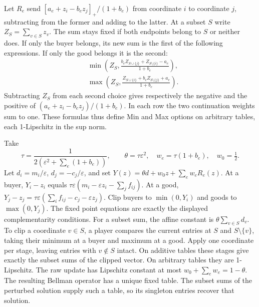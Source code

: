 \documentclass[11pt,oneside,openany,notitlepage]{report}
\begin{document}
Let \(R_e\) send \([a_e+z_i-b_ez_j]_+/(1+b_e)\) from coordinate \(i\)
to coordinate \(j\), subtracting from the former and adding to the latter.
At a subset \(S\) write \(Z_S=\sum_{v\in S}z_v\). The sum stays fixed if
both endpoints belong to \(S\) or neither does. If only the buyer belongs,
its new sum is the first of the following expressions. If only the good
belongs it is the second:
\begin{align*}
 &\min\!\left(Z_S,\frac{b_e Z_{S\cup\{j\}}+Z_{S\setminus\{i\}}-a_e}{1+b_e}\right),\\
 &\max\!\left(Z_S,\frac{Z_{S\cup\{i\}}+b_e Z_{S\setminus\{j\}}+a_e}{1+b_e}\right).
\end{align*}
Subtracting \(Z_S\) from each second choice gives respectively the negative
and the positive of \((a_e+z_i-b_ez_j)/(1+b_e)\). In each row the two
continuation weights sum to one. These formulas thus define Min and Max
options on arbitrary tables, each 1-Lipschitz in the sup norm.

Take
\[
 \tau=\frac1{2(\varepsilon^2+\sum_e(1+b_e))},\qquad
 \theta=\tau\varepsilon^2,\quad w_e=\tau(1+b_e),\quad w_0=\tfrac12 .
\]
Let \(d_i=m_i/\varepsilon\), \(d_j=-c_j/\varepsilon\), and set
\(Y(z)=\theta d+w_0z+\sum_e w_eR_e(z)\). At a buyer, \(Y_i-z_i\) equals
\(\tau\varepsilon(m_i-\varepsilon z_i-\sum_j f_{ij})\). At a good,
\(Y_j-z_j=\tau\varepsilon(\sum_i f_{ij}-c_j-\varepsilon z_j)\).
Clip buyers to \(\min(0,Y_i)\) and goods to \(\max(0,Y_j)\). The fixed
point equations are exactly the displayed complementarity conditions.
For a subset sum, the affine constant is \(\theta\sum_{v\in S}d_v\).
To clip a coordinate \(v\in S\), a player compares the current entries
at \(S\) and \(S\setminus\{v\}\), taking their minimum at a buyer and
maximum at a good. Apply one coordinate per stage, leaving entries with
\(v\notin S\) intact. On additive tables these stages give exactly the
subset sums of the clipped vector. On arbitrary tables they are
1-Lipschitz. The raw update has Lipschitz constant at most
\(w_0+\sum_e w_e=1-\theta\). The resulting Bellman operator has a unique
fixed table. The subset sums of the perturbed solution supply such a
table, so its singleton entries recover that solution.
\end{document}
